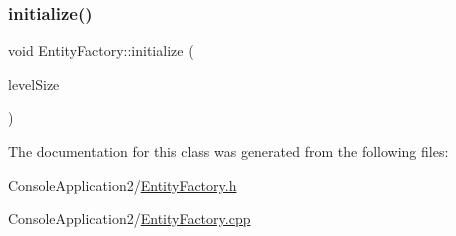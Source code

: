 \hypertarget{class_entity_factory_a7a2d1bf2e09b30ae6db3ee7f060763d8}{}\label{class_entity_factory_a7a2d1bf2e09b30ae6db3ee7f060763d8} 
\subsubsection{\texorpdfstring{initialize()}{initialize()}}
{\footnotesize\ttfamily void Entity\+Factory\+::initialize (\begin{DoxyParamCaption}\item[{sf\+::\+Float\+Rect}]{level\+Size }\end{DoxyParamCaption})\hspace{0.3cm}{\ttfamily [static]}}



The documentation for this class was generated from the following files\+:\begin{DoxyCompactItemize}
\item 
Console\+Application2/\hyperlink{_entity_factory_8h}{Entity\+Factory.\+h}\item 
Console\+Application2/\hyperlink{_entity_factory_8cpp}{Entity\+Factory.\+cpp}\end{DoxyCompactItemize}
